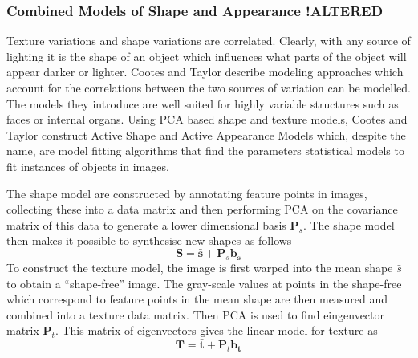 \documentclass[11pt,a4paper]{report}
\begin{document}

\subsubsection{Combined Models of Shape and Appearance !ALTERED}
Texture variations and shape variations are correlated. Clearly, with any source of
lighting it is the shape of an object which influences what parts of the object
will appear darker or lighter. Cootes and Taylor \cite{activeApp04} describe modeling approaches
which account for the correlations between the two sources of
variation can be modelled. The models they introduce are well suited for highly
variable structures such as faces or internal organs. Using PCA based shape and
texture models, Cootes and Taylor construct Active
Shape and Active Appearance Models which, despite the name, are model fitting algorithms that find the parameters statistical models to fit instances of objects in images.

The shape model are constructed by annotating feature points in
images, collecting these into a data matrix and then performing PCA on the
covariance matrix of this data to generate a lower dimensional basis
$\mathbf{P}_s$. The shape model then makes it possible to synthesise new shapes
as follows
\begin{equation}\label{eq:shape}
\mathbf{S} = \mathbf{\bar{s}} + \mathbf{P}_s\mathbf{b_s}
\end{equation}
To construct the texture model, the image is first warped into the mean shape
$\bar{s}$ to obtain a ``shape-free'' image. The gray-scale values at points in
the shape-free which correspond to feature points in the mean shape are then
measured and combined into a texture data matrix. Then PCA is used to find
eingenvector matrix $\mathbf{P}_t$. This matrix of eigenvectors gives the
linear model for texture as
\begin{equation}\label{eq:text}
\mathbf{T} = \mathbf{\bar{t}} + \mathbf{P}_t\mathbf{b_t}
\end{equation}
\end{document}
